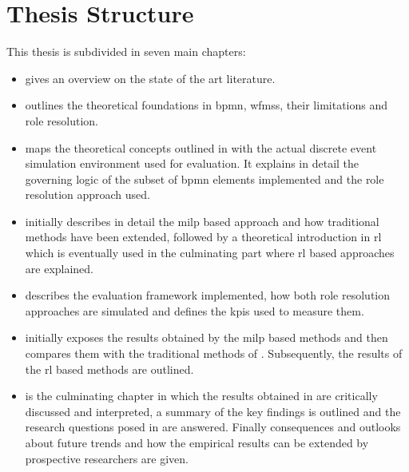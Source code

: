 \section{Thesis Structure}

This thesis is subdivided in seven main chapters:

\begin{itemize}
	\item {} gives an overview on the state of the art literature.
	\item {} outlines the theoretical foundations in \gls{bpmn}, \glspl{wfms}, their limitations and role resolution. 
	\item {} maps the theoretical concepts outlined in  with the actual discrete event simulation environment used for evaluation. It explains in detail the governing logic of the subset of \gls{bpmn} elements implemented and the role resolution approach used.
	\item {} initially describes in detail the \gls{milp} based approach and how traditional methods have been extended, followed by a theoretical introduction in \gls{rl} which is eventually used in the culminating part where \gls{rl} based approaches are explained.
	\item {} describes the evaluation framework implemented, how both role resolution approaches are simulated and defines the \glspl{kpi} used to measure them.
	\item {} initially exposes the results obtained by the \gls{milp} based methods and then compares them with the traditional methods of \citet{Zeng2005}. Subsequently, the results of the \gls{rl} based methods are outlined.
	\item {} is the culminating chapter in which the results obtained in  are critically discussed and interpreted,	a summary of the key findings is outlined and the research questions posed in  are answered. Finally consequences and outlooks about future trends and how the empirical results can be extended by prospective researchers are given.
\end{itemize}